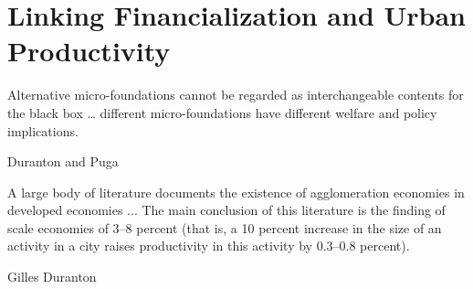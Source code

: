 \chapter{Linking Financialization and Urban Productivity} \label{chapter-tramsmission} %

\epigraph{Alternative micro-foundations cannot be regarded as interchangeable contents for the black box \dots %
different micro-foundations have different welfare and policy implications. %
}{Duranton and Puga \cite{durantonMicroFoundationsUrbanAgglomeration2004}}

\epigraph{A large body of literature documents the existence of agglomeration economies in developed economies ... The main conclusion of this literature is the finding of scale economies of 3--8 percent (that is, a 10 percent increase in the size of an activity in a city raises productivity in this activity by 0.3--0.8 percent).}{Gilles Duranton \cite{durantonAreCitiesEngines2009}} %




